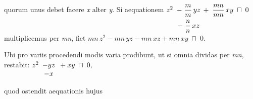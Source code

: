 \rule[-4mm]{0mm}{10mm}%
quorum unus debet facere \textit{x} alter \textit{y}.
\pend%
\count{}%
\count{}%
\count{}
\pstart%
Si
%
%
aequationem%
\protect{}
$z^2
\protect\begin{array}[t]{c}
-\; \displaystyle\frac{m}{\vphantom{Ig}m}\,yz \\
-\; \displaystyle\frac{\vphantom{I}n}{n}\,xz
\protect\end{array}\!\!
+\; \displaystyle\frac{mn}{mn}\, xy
\;\sqcap\; 0$
multiplicemus per \textit{mn},%
%
fiet
$mn\, z^2-mn\, yz-mn\, xz+mn\, xy\; \sqcap\; 0.$
%
%
%
\rule[0mm]{0mm}{4mm}%
Ubi pro variis procedendi modis%
\protect{}
varia prodibunt,
ut si omnia dividas per \textit{mn},
restabit:
$z^2\protect\begin{array}[t]{c}-yz\\-x\protect\end{array}+xy\; \sqcap\; 0,$%
\rule[-0mm]{0pt}{4mm}
quod ostendit
aequationis hujus%
\protect{}
